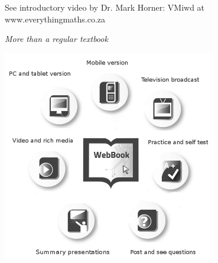 {See introductory video by Dr. Mark Horner:  VMiwd at www.everythingmaths.co.za



}






\newpage
\thispagestyle{empty}

{\normalfont\sffamily\fontsize{22}\normalfont\itshape More than a regular textbook} \par

\begin{center}
\includegraphics[width=0.70\textwidth]{title_images/morethantextbook.png}
\end{center}

